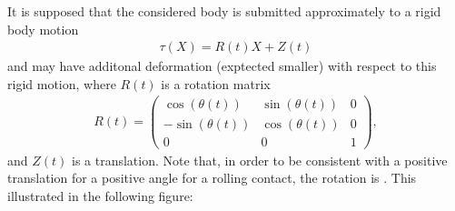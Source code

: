 \documentclass[a4paper,11pt,english]{sphinxmanual}
\begin{document}
It is supposed that the considered body is submitted approximately to a rigid body motion
\begin{equation*}
\begin{split}\tau(X) = R(t)X + Z(t)\end{split}
\end{equation*}
and may have additonal deformation (exptected smaller) with respect to this rigid motion, where \(R(t)\) is a rotation matrix
\begin{equation*}
\begin{split}R(t) = \left(\begin{array}{ccc}
\cos(\theta(t)) & \sin(\theta(t)) & 0 \\
-\sin(\theta(t)) & \cos(\theta(t)) & 0 \\
0 & 0 & 1
\end{array} \right),\end{split}
\end{equation*}
and \(Z(t)\) is a translation. Note that, in order to be consistent with a positive translation for a positive angle for a rolling contact, the rotation is . This illustrated in the following figure:

\begin{figure}[htbp]
\centering

\noindent{}
\end{figure}
\end{document}
